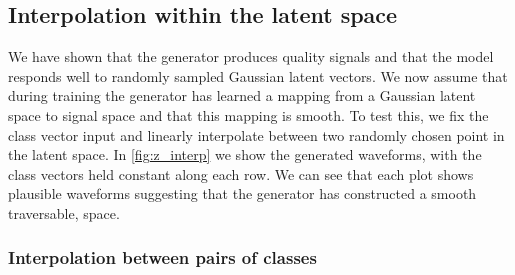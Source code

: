 \documentclass[12pt]{iopart}
\begin{document}
\subsection{Interpolation within the latent space}
%
%
 We have shown that the generator produces quality signals and that the model responds well to randomly sampled Gaussian latent vectors. We now assume that during training the generator has learned a mapping from a Gaussian latent space to signal space and that this mapping is smooth. To test this, we fix the class vector input and linearly interpolate between two randomly chosen point in the latent space. In \cref{fig:z_interp} we show the generated waveforms, with the class vectors held constant along each row. We can see that each plot shows plausible waveforms suggesting that the generator has constructed a smooth traversable, space.
\subsubsection{Interpolation between pairs of classes}
\end{document}
